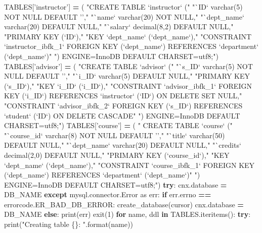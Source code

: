 \documentclass[]{article}
\newenvironment{Shaded}{\begin{snugshade}}{\end{snugshade}}
\newcommand{\KeywordTok}[1]{\textcolor[rgb]{0.13,0.29,0.53}{\textbf{#1}}}
\newcommand{\DecValTok}[1]{\textcolor[rgb]{0.00,0.00,0.81}{#1}}
\newcommand{\SpecialCharTok}[1]{\textcolor[rgb]{0.00,0.00,0.00}{#1}}
\newcommand{\StringTok}[1]{\textcolor[rgb]{0.31,0.60,0.02}{#1}}
\newcommand{\ImportTok}[1]{#1}
\newcommand{\ControlFlowTok}[1]{\textcolor[rgb]{0.13,0.29,0.53}{\textbf{#1}}}
\newcommand{\OperatorTok}[1]{\textcolor[rgb]{0.81,0.36,0.00}{\textbf{#1}}}
\newcommand{\BuiltInTok}[1]{#1}
\newcommand{\NormalTok}[1]{#1}
\begin{document}
\begin{Shaded}
\begin{Highlighting}[]
\NormalTok{TABLES[}\StringTok{'instructor'}\NormalTok{] }\OperatorTok{=}\NormalTok{ (}
    \StringTok{"CREATE TABLE `instructor` ("}
    \StringTok{"`ID` varchar(5) NOT NULL DEFAULT '',"}
    \StringTok{"`name` varchar(20) NOT NULL,"}
    \StringTok{"`dept_name` varchar(20) DEFAULT NULL,"}
    \StringTok{"`salary` decimal(8,2) DEFAULT NULL,"}
    \StringTok{"PRIMARY KEY (`ID`),"}
     \StringTok{"KEY `dept_name` (`dept_name`),"}
     \StringTok{"CONSTRAINT `instructor_ibfk_1` FOREIGN KEY (`dept_name`) REFERENCES `department` (`dept_name`)"}
    \StringTok{") ENGINE=InnoDB DEFAULT CHARSET=utf8;"}\NormalTok{)}
\NormalTok{TABLES[}\StringTok{'advisor'}\NormalTok{] }\OperatorTok{=}\NormalTok{ (}
    \StringTok{"CREATE TABLE `advisor` ("}
  \StringTok{"`s_ID` varchar(5) NOT NULL DEFAULT '',"}
  \StringTok{"`i_ID` varchar(5) DEFAULT NULL,"}
  \StringTok{"PRIMARY KEY (`s_ID`),"}
  \StringTok{"KEY `i_ID` (`i_ID`),"}
  \StringTok{"CONSTRAINT `advisor_ibfk_1` FOREIGN KEY (`i_ID`) REFERENCES `instructor` (`ID`) ON DELETE SET NULL,"}
  \StringTok{"CONSTRAINT `advisor_ibfk_2` FOREIGN KEY (`s_ID`) REFERENCES `student` (`ID`) ON DELETE CASCADE"}
    \StringTok{") ENGINE=InnoDB DEFAULT CHARSET=utf8;"}\NormalTok{)}
\NormalTok{TABLES[}\StringTok{'course'}\NormalTok{] }\OperatorTok{=}\NormalTok{ (}
\StringTok{"    CREATE TABLE `course` ("}
  \StringTok{"`course_id` varchar(8) NOT NULL DEFAULT '',"}
  \StringTok{"`title` varchar(50) DEFAULT NULL,"}
  \StringTok{"`dept_name` varchar(20) DEFAULT NULL,"}
  \StringTok{"`credits` decimal(2,0) DEFAULT NULL,"}
  \StringTok{"PRIMARY KEY (`course_id`),"}
  \StringTok{"KEY `dept_name` (`dept_name`),"}
  \StringTok{"CONSTRAINT `course_ibfk_1` FOREIGN KEY (`dept_name`) REFERENCES `department` (`dept_name`)"}
\StringTok{") ENGINE=InnoDB DEFAULT CHARSET=utf8;"}\NormalTok{)}
\ControlFlowTok{try}\NormalTok{:}
\NormalTok{    cnx.database }\OperatorTok{=}\NormalTok{ DB_NAME  }
\ControlFlowTok{except}\NormalTok{ mysql.connector.Error }\ImportTok{as}\NormalTok{ err:}
    \ControlFlowTok{if}\NormalTok{ err.errno }\OperatorTok{==}\NormalTok{ errorcode.ER_BAD_DB_ERROR:}
\NormalTok{        create_database(cursor)}
\NormalTok{        cnx.database }\OperatorTok{=}\NormalTok{ DB_NAME}
    \ControlFlowTok{else}\NormalTok{:}
        \BuiltInTok{print}\NormalTok{(err)}
\NormalTok{        exit(}\DecValTok{1}\NormalTok{)}
\ControlFlowTok{for}\NormalTok{ name, ddl }\KeywordTok{in}\NormalTok{ TABLES.iteritems():}
    \ControlFlowTok{try}\NormalTok{:}
        \BuiltInTok{print}\NormalTok{(}\StringTok{"Creating table }\SpecialCharTok{\{\}}\StringTok{: "}\NormalTok{.}\BuiltInTok{format}\NormalTok{(name))}

\end{Highlighting}
\end{Shaded}
\end{document}
